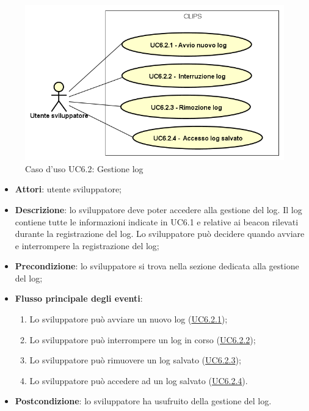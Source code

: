 \documentclass[../AnalisiDeiRequisiti.tex]{subfiles}
\begin{document}
\begin{figure}[H]
	\centering
	\includegraphics[scale=0.95, width=\textwidth]{img/UC6-2.png}
	\caption{Caso d'uso UC6.2: Gestione log}\label{fig:UC6.2} 
\end{figure}
\begin{itemize}
	\item \textbf{Attori}: utente sviluppatore;
	\item \textbf{Descrizione}: lo sviluppatore deve poter accedere alla gestione del log. Il log contiene tutte le informazioni indicate in UC6.1 e relative ai beacon rilevati durante la registrazione del log. Lo sviluppatore può decidere quando avviare e interrompere la registrazione del log; 
	\item \textbf{Precondizione}: lo sviluppatore si trova nella sezione dedicata alla gestione del log;
	
	\item \textbf{Flusso principale degli eventi}:
	\begin{enumerate}
		\item Lo sviluppatore può avviare un nuovo log (\hyperlink{UC6.2.1}{UC6.2.1});
		\item Lo sviluppatore può interrompere un log in corso (\hyperlink{UC6.2.2}{UC6.2.2});
		\item Lo sviluppatore può rimuovere un log salvato (\hyperlink{UC6.2.3}{UC6.2.3});
		\item Lo sviluppatore può accedere ad un log salvato (\hyperlink{UC6.2.4}{UC6.2.4}).
		
	\end{enumerate}
	\item \textbf{Postcondizione}: lo sviluppatore ha usufruito della gestione del log.
\end{itemize}
\hypertarget{UC6.2.1}{}
\end{document}
